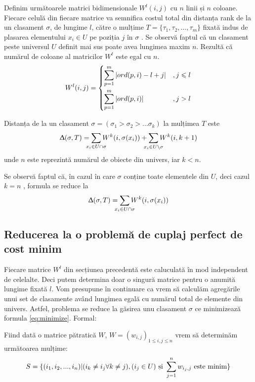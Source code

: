 Definim următoarele matrici bidimensionale $W^l(i, j)$ cu $n$ linii și $n$ coloane. Fiecare celulă
din fiecare matrice va semnifica costul total din distanța rank de la un clasament $\sigma$, de 
lungime $l$, către o mulțime $T = \{\tau_1, \tau_2, ..., \tau_m\}$ fixată indus de plasarea 
elementului $x_i \in U$ pe poziția $j$ în $\sigma$ \cite{rankaggregationproblem}. Se observă faptul
că un clasament peste universul $U$ definit mai sus poate avea lungimea maxim $n$. Rezultă că 
numărul de coloane al matricilor $W^t$ este egal cu $n$.
\[
  W^l(i, j) = \begin{dcases}
    \smashoperator{\sum_{p=1}^{m}} | ord(p, i) - l + j |    &, j \leqslant l \\
    \smashoperator{\sum_{p=1}^{m}} | ord(p, i) |            &, j > l
  \end{dcases}
\]

\begin{remark}
Distanța de la un clasament $\sigma=(\sigma_1 > \sigma_2 > ... \sigma_k)$ la mulțimea $T$ este
\[
  \Updelta(\sigma, T) = \smashoperator{\sum_{x_i \in U \cap \sigma}} W^k(i, \sigma(x_i)) +
      \smashoperator{\sum_{x_i \in U \setminus \sigma}} W^k(i, k + 1)
\]unde $n$ este reprezintă numărul de obiecte din univers, iar $k < n$.
\end{remark}
Se observă faptul că, în cazul în care $\sigma$ conține toate elementele din $U$, deci cazul $k = n$
, formula se reduce la 
\begin{gather}
  \label{eq:minimize}
  \Updelta(\sigma, T) = \smashoperator{\sum_{x_i \in U \cap \sigma}} W^k(i, \sigma(x_i))
\end{gather}


\subsection{Reducerea la o problemă de cuplaj perfect de cost minim}
Fiecare matrice $W^l$ din secțiunea precedentă este caluculată în mod independent de celelalte.
Deci putem determina doar o singură matrice pentru o anumită lungime fixată $l$. Vom presupune
în continuare ca vrem să calculăm agregările unui set de clasamente având lungimea egală cu numărul
total de elemente din univers. Astfel, problema se reduce la găsirea unu clasament $\sigma$ ce 
minimizează formula \eqref{eq:minimize}. Formal:

\begin{problem}
Fiind dată o matrice pătratică $W$, $W = (w_{i, j})_{1 \leqslant i,j \leqslant n}$ vrem să
determinăm următoarea mulțime:
\[
  S = \{(i_1, i_2, ..., i_n) | (i_k \neq i_j \forall k \neq j), (i_j \in U) \text{ și } \smashoperator{\sum_{j=1}^n} w_{i_j, j} \text{ este minim}\}
\]
\end{problem}

